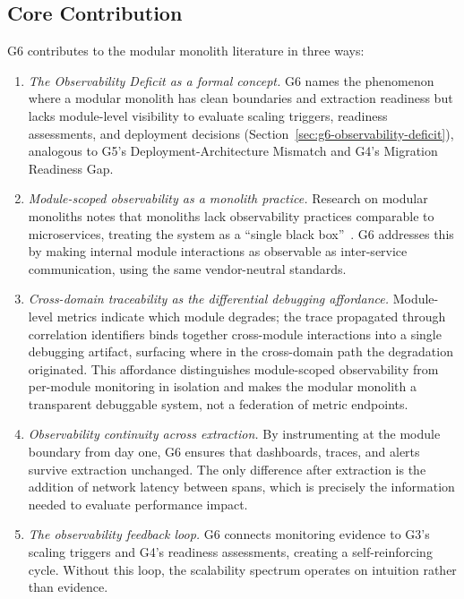 \subsection*{Core Contribution}

G6 contributes to the modular monolith literature in three ways:

\begin{enumerate}[itemsep=8pt,topsep=2pt]
  \item \emph{The Observability Deficit as a formal concept.} G6 names the phenomenon where a modular monolith has clean boundaries and extraction readiness but lacks module-level visibility to evaluate scaling triggers, readiness assessments, and deployment decisions (Section~\ref{sec:g6-observability-deficit}), analogous to G5's Deployment-Architecture Mismatch and G4's Migration Readiness Gap.

  \item \emph{Module-scoped observability as a monolith practice.} Research on modular monoliths notes that monoliths lack observability practices comparable to microservices, treating the system as a ``single black box''~\cite{montesi2021sliceable}. G6 addresses this by making internal module interactions as observable as inter-service communication, using the same vendor-neutral standards.

  \item \emph{Cross-domain traceability as the differential debugging affordance.} Module-level metrics indicate which module degrades; the trace propagated through correlation identifiers binds together cross-module interactions into a single debugging artifact, surfacing where in the cross-domain path the degradation originated. This affordance distinguishes module-scoped observability from per-module monitoring in isolation and makes the modular monolith a transparent debuggable system, not a federation of metric endpoints.

  \item \emph{Observability continuity across extraction.} By instrumenting at the module boundary from day one, G6 ensures that dashboards, traces, and alerts survive extraction unchanged. The only difference after extraction is the addition of network latency between spans, which is precisely the information needed to evaluate performance impact.

  \item \emph{The observability feedback loop.} G6 connects monitoring evidence to G3's scaling triggers and G4's readiness assessments, creating a self-reinforcing cycle. Without this loop, the scalability spectrum operates on intuition rather than evidence.
\end{enumerate}

